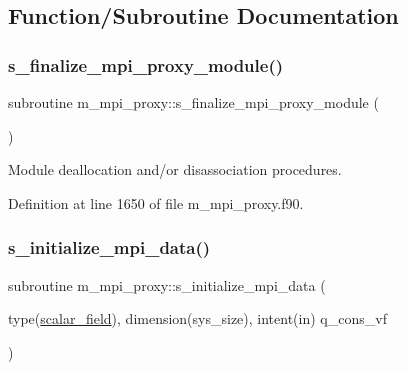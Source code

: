 \subsection{Function/\+Subroutine Documentation}
\mbox{\label{namespacem__mpi__proxy_ac984c84fe4140876d6600250af9807da}} 
\subsubsection{\texorpdfstring{s\+\_\+finalize\+\_\+mpi\+\_\+proxy\+\_\+module()}{s\_finalize\_mpi\_proxy\_module()}}
{\footnotesize\ttfamily subroutine m\+\_\+mpi\+\_\+proxy\+::s\+\_\+finalize\+\_\+mpi\+\_\+proxy\+\_\+module (\begin{DoxyParamCaption}{ }\end{DoxyParamCaption})}



Module deallocation and/or disassociation procedures. 



Definition at line 1650 of file m\+\_\+mpi\+\_\+proxy.\+f90.

\mbox{\label{namespacem__mpi__proxy_a2ff35ede51e90c483969e44c31303415}} 
\subsubsection{\texorpdfstring{s\+\_\+initialize\+\_\+mpi\+\_\+data()}{s\_initialize\_mpi\_data()}}
{\footnotesize\ttfamily subroutine m\+\_\+mpi\+\_\+proxy\+::s\+\_\+initialize\+\_\+mpi\+\_\+data (\begin{DoxyParamCaption}\item[{type(\hyperlink{structm__derived__types_1_1scalar__field}{scalar\+\_\+field}), dimension(sys\+\_\+size), intent(in)}]{q\+\_\+cons\+\_\+vf }\end{DoxyParamCaption})}



